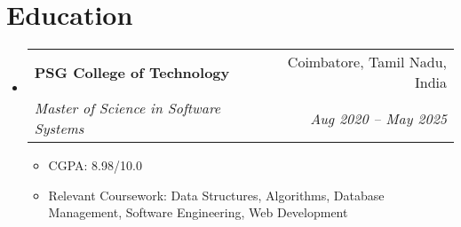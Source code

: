 \documentclass[11pt,letterpaper]{article}
\makeatletter
\newcommand{\resumeItem}[1]{
  \item\small{
    {#1 \vspace{-2pt}}
  }
}
\newcommand{\resumeSubheading}[4]{
  \vspace{-1pt}\item
    \begin{tabular*}{0.97\textwidth}[t]{l@{\extracolsep{\fill}}r}
      \textbf{#1} & #2 \\
      \textit{\small#3} & \textit{\small #4} \\
    \end{tabular*}\vspace{-5pt}
}
\newcommand{\resumeSubHeadingListStart}{\begin{itemize}[leftmargin=0.15in, label={}]}
\newcommand{\resumeSubHeadingListEnd}{\end{itemize}}
\newcommand{\resumeItemListStart}{\begin{itemize}}
\newcommand{\resumeItemListEnd}{\end{itemize}\vspace{-5pt}}
\makeatother
\begin{document}
\section{Education}
  \resumeSubHeadingListStart
    \resumeSubheading
      {PSG College of Technology}{Coimbatore, Tamil Nadu, India}
      {Master of Science in Software Systems}{Aug 2020 -- May 2025}
      \resumeItemListStart
        \resumeItem{CGPA: 8.98/10.0}
        \resumeItem{Relevant Coursework: Data Structures, Algorithms, Database Management, Software Engineering, Web Development}
      \resumeItemListEnd
  \resumeSubHeadingListEnd
\end{document}
